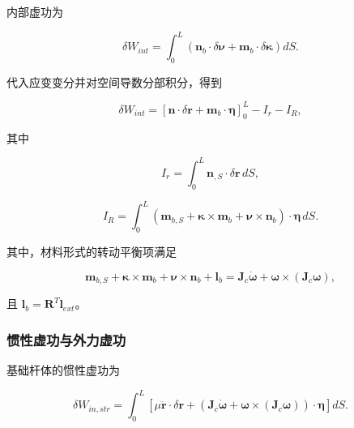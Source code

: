 内部虚功为

\begin{equation}
\label{eq:rod-1-80}
\delta W_{int} = \int_{0}^{L}\left( \mathbf{n}_{b} \cdot \delta\bm{\nu} + \mathbf{m}_{b} \cdot \delta\bm{\kappa} \right)dS.
\end{equation}

代入应变变分并对空间导数分部积分，得到

\begin{equation}
\label{eq:rod-1-81}
\delta W_{int} = \left\lbrack \mathbf{n} \cdot \delta\mathbf{r} + \mathbf{m}_{b} \cdot \bm{\eta} \right\rbrack_{0}^{L} - I_{r} - I_{R},
\end{equation}

其中

\begin{equation}
\label{eq:rod-1-82}
I_{r} = \int_{0}^{L}\mathbf{n}_{,S} \cdot \delta\mathbf{r}\, dS,
\end{equation}

\begin{equation}
\label{eq:rod-1-83}
I_{R} = \int_{0}^{L}\left( \mathbf{m}_{b,S} + \bm{\kappa} \times \mathbf{m}_{b} + \bm{\nu} \times \mathbf{n}_{b} \right) \cdot \bm{\eta}\, dS.
\end{equation}

其中，材料形式的转动平衡项满足

\begin{equation}
\label{eq:rod-1-84}
\mathbf{m}_{b,S} + \bm{\kappa} \times \mathbf{m}_{b} + \bm{\nu} \times \mathbf{n}_{b} + \mathbf{l}_{b} = \mathbf{J}_{c}\dot{\bm{\omega}} + \bm{\omega} \times \left( \mathbf{J}_{c}\bm{\omega} \right),
\end{equation}

且 \(\mathbf{l}_{b} = \mathbf{R}^{T}\mathbf{l}_{ext}\)。

\subsubsection{惯性虚功与外力虚功}\label{sec:rod-1-5-3}

基础杆体的惯性虚功为

\begin{equation}
\label{eq:rod-1-85}
\delta W_{in,str} = \int_{0}^{L}\left\lbrack \mu\ddot{\mathbf{r}} \cdot \delta\mathbf{r} + \left( \mathbf{J}_{c}\dot{\bm{\omega}} + \bm{\omega} \times \left( \mathbf{J}_{c}\bm{\omega} \right) \right) \cdot \bm{\eta} \right\rbrack dS.
\end{equation}

